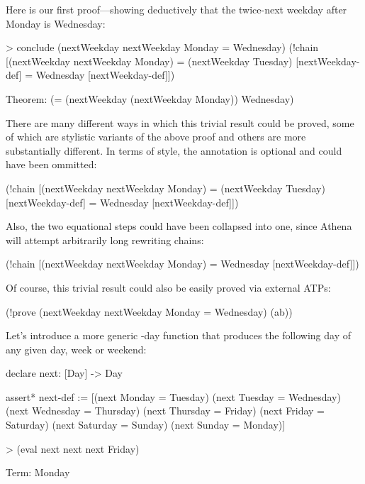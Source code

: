 Here is our first proof---showing deductively that the twice-next weekday after Monday is Wednesday:
\begin{tcAthena}
> conclude (nextWeekday nextWeekday Monday = Wednesday) 
    (!chain [(nextWeekday nextWeekday Monday) 
           = (nextWeekday Tuesday)                 [nextWeekday-def]
           = Wednesday                             [nextWeekday-def]])

Theorem: (= (nextWeekday (nextWeekday Monday))
            Wednesday)
\end{tcAthena}
There are many different ways in which this trivial result could be proved, some of which are stylistic variants of the above
proof and others are more substantially different. In terms of style, the  annotation is optional and could have
been ommitted: 
\begin{tcAthena}
(!chain [(nextWeekday nextWeekday Monday) 
       = (nextWeekday Tuesday)                 [nextWeekday-def]
       = Wednesday                             [nextWeekday-def]])
\end{tcAthena}
Also, the two equational steps could have been collapsed into one, since Athena will attempt arbitrarily long rewriting chains: 
\begin{tcAthena}
(!chain [(nextWeekday nextWeekday Monday) = Wednesday [nextWeekday-def]])
\end{tcAthena}
Of course, this trivial result could also be easily proved via external ATPs: 
\begin{tcAthena}
(!prove (nextWeekday nextWeekday Monday = Wednesday) (ab))
\end{tcAthena}
Let's introduce a more generic -day function that produces the following day of any given day, week or weekend: 
\begin{tcAthena}
declare next: [Day] -> Day 

assert* next-def := [(next Monday    = Tuesday)
                     (next Tuesday   = Wednesday)
                     (next Wednesday = Thursday)
                     (next Thursday  = Friday)
                     (next Friday    = Saturday)
                     (next Saturday  = Sunday)
                     (next Sunday    = Monday)]

> (eval next next next Friday)

Term: Monday
\end{tcAthena}


